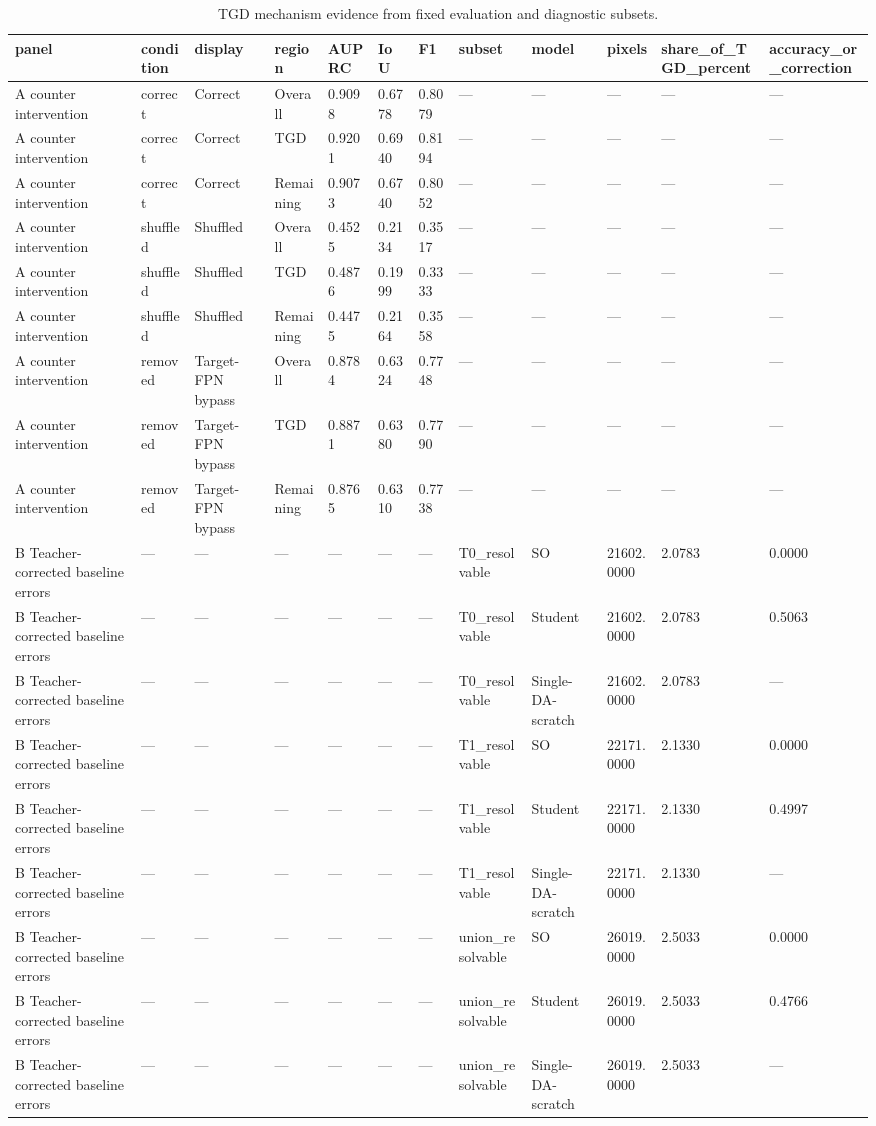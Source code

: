 \begin{table}[t]
\centering
\begin{tabular}{llllllllllll}
\toprule
panel & condition & display & region & AUPRC & IoU & F1 & subset & model & pixels & share\_of\_TGD\_percent & accuracy\_or\_correction \\
\midrule
A counter intervention & correct & Correct & Overall & 0.9098 & 0.6778 & 0.8079 & — & — & — & — & — \\
A counter intervention & correct & Correct & TGD & 0.9201 & 0.6940 & 0.8194 & — & — & — & — & — \\
A counter intervention & correct & Correct & Remaining & 0.9073 & 0.6740 & 0.8052 & — & — & — & — & — \\
A counter intervention & shuffled & Shuffled & Overall & 0.4525 & 0.2134 & 0.3517 & — & — & — & — & — \\
A counter intervention & shuffled & Shuffled & TGD & 0.4876 & 0.1999 & 0.3333 & — & — & — & — & — \\
A counter intervention & shuffled & Shuffled & Remaining & 0.4475 & 0.2164 & 0.3558 & — & — & — & — & — \\
A counter intervention & removed & Target-FPN bypass & Overall & 0.8784 & 0.6324 & 0.7748 & — & — & — & — & — \\
A counter intervention & removed & Target-FPN bypass & TGD & 0.8871 & 0.6380 & 0.7790 & — & — & — & — & — \\
A counter intervention & removed & Target-FPN bypass & Remaining & 0.8765 & 0.6310 & 0.7738 & — & — & — & — & — \\
B Teacher-corrected baseline errors & — & — & — & — & — & — & T0\_resolvable & SO & 21602.0000 & 2.0783 & 0.0000 \\
B Teacher-corrected baseline errors & — & — & — & — & — & — & T0\_resolvable & Student & 21602.0000 & 2.0783 & 0.5063 \\
B Teacher-corrected baseline errors & — & — & — & — & — & — & T0\_resolvable & Single-DA-scratch & 21602.0000 & 2.0783 & — \\
B Teacher-corrected baseline errors & — & — & — & — & — & — & T1\_resolvable & SO & 22171.0000 & 2.1330 & 0.0000 \\
B Teacher-corrected baseline errors & — & — & — & — & — & — & T1\_resolvable & Student & 22171.0000 & 2.1330 & 0.4997 \\
B Teacher-corrected baseline errors & — & — & — & — & — & — & T1\_resolvable & Single-DA-scratch & 22171.0000 & 2.1330 & — \\
B Teacher-corrected baseline errors & — & — & — & — & — & — & union\_resolvable & SO & 26019.0000 & 2.5033 & 0.0000 \\
B Teacher-corrected baseline errors & — & — & — & — & — & — & union\_resolvable & Student & 26019.0000 & 2.5033 & 0.4766 \\
B Teacher-corrected baseline errors & — & — & — & — & — & — & union\_resolvable & Single-DA-scratch & 26019.0000 & 2.5033 & — \\
\bottomrule
\end{tabular}
\caption{TGD mechanism evidence from fixed evaluation and diagnostic subsets.}\label{tab:tgd}
\end{table}
